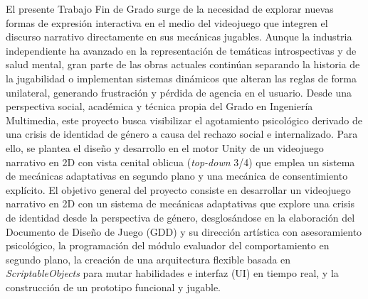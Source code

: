 
El presente Trabajo Fin de Grado surge de la necesidad de explorar nuevas formas de expresión interactiva en el medio del videojuego que integren el discurso narrativo directamente en sus mecánicas jugables. Aunque la industria independiente ha avanzado en la representación de temáticas introspectivas y de salud mental, gran parte de las obras actuales continúan separando la historia de la jugabilidad o implementan sistemas dinámicos que alteran las reglas de forma unilateral, generando frustración y pérdida de agencia en el usuario.
Desde una perspectiva social, académica y técnica propia del Grado en Ingeniería Multimedia, este proyecto busca visibilizar el agotamiento psicológico derivado de una crisis de identidad de género a causa del rechazo social e internalizado. Para ello, se plantea el diseño y desarrollo en el motor Unity de un videojuego narrativo en 2D con vista cenital oblicua (\textit{top-down} 3/4) que emplea un sistema de mecánicas adaptativas en segundo plano y una mecánica de consentimiento explícito.
El objetivo general del proyecto consiste en desarrollar un videojuego narrativo en 2D con un sistema de mecánicas adaptativas que explore una crisis de identidad desde la perspectiva de género, desglosándose en la elaboración del Documento de Diseño de Juego (\ac{GDD}) y su dirección artística con asesoramiento psicológico, la programación del módulo evaluador del comportamiento en segundo plano, la creación de una arquitectura flexible basada en \textit{ScriptableObjects} para mutar habilidades e interfaz (\ac{UI}) en tiempo real, y la construcción de un prototipo funcional y jugable.